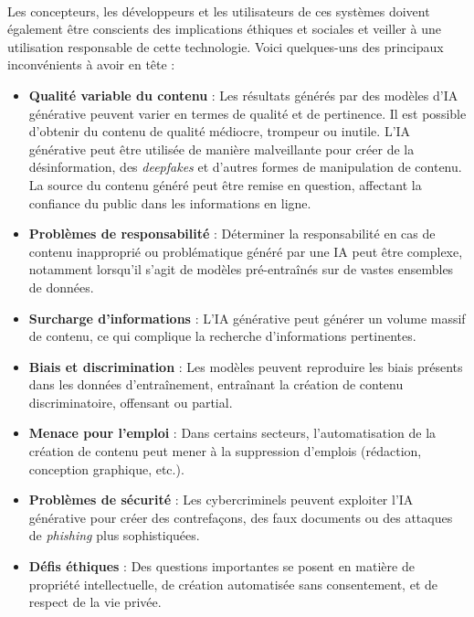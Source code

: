 \paragraph{}
Les concepteurs, les développeurs et les utilisateurs de ces systèmes doivent également
être conscients des implications éthiques et sociales et veiller à une utilisation
responsable de cette technologie. Voici quelques-uns des principaux
inconvénients à avoir en tête :
\begin{itemize}[label=--]
	\item \textbf{Qualité variable du contenu} : Les résultats générés par des
		modèles d'IA générative peuvent varier en termes de qualité et de pertinence.
		Il est possible d'obtenir du contenu de qualité médiocre, trompeur ou
		inutile. L'IA générative peut être utilisée de manière malveillante pour créer
		de la désinformation, des \textit{deepfakes} et d'autres formes de manipulation
		de contenu. La source du contenu généré peut être remise en question, affectant
		la confiance du public dans les informations en ligne.

	\item \textbf{Problèmes de responsabilité} : Déterminer la responsabilité en
		cas de contenu inapproprié ou problématique généré par une IA peut être
		complexe, notamment lorsqu'il s'agit de modèles pré-entraînés sur de vastes ensembles
		de données.

	\item \textbf{Surcharge d'informations} : L'IA générative peut générer un
		volume massif de contenu, ce qui complique la recherche d'informations pertinentes.

	\item \textbf{Biais et discrimination} : Les modèles peuvent reproduire les
		biais présents dans les données d'entraînement, entraînant la création de contenu
		discriminatoire, offensant ou partial.

	\item \textbf{Menace pour l'emploi} : Dans certains secteurs, l'automatisation
		de la création de contenu peut mener à la suppression d'emplois (rédaction, conception
		graphique, etc.).

	\item \textbf{Problèmes de sécurité} : Les cybercriminels peuvent exploiter l'IA
		générative pour créer des contrefaçons, des faux documents ou des attaques de
		\textit{phishing} plus sophistiquées.

	\item \textbf{Défis éthiques} : Des questions importantes se posent en matière
		de propriété intellectuelle, de création automatisée sans consentement, et
		de respect de la vie privée.
\end{itemize}
